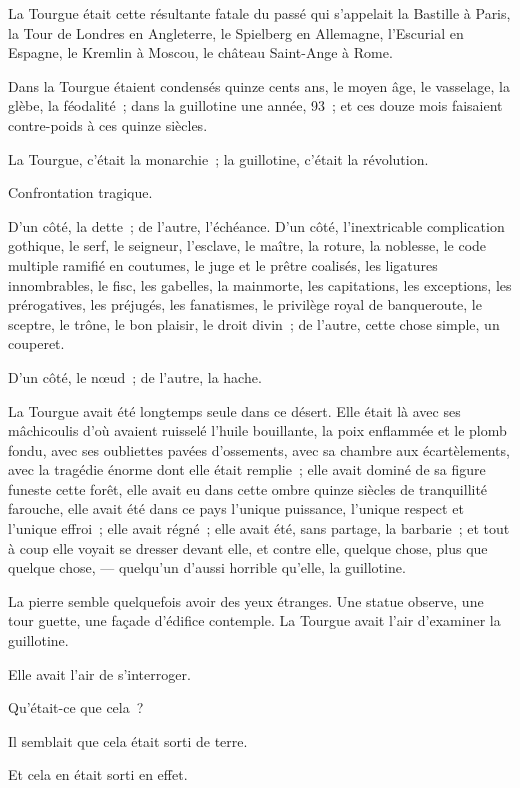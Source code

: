 \documentclass[french,twoside]{book} %
\begin{document}
La Tourgue était cette résultante fatale du passé qui s’appelait la Bastille à Paris, la Tour de Londres en Angleterre, le Spielberg en Allemagne, l’Escurial  en Espagne, le Kremlin à Moscou, le château Saint-Ange à Rome.\par
Dans la Tourgue étaient condensés quinze cents ans, le moyen âge, le vasselage, la glèbe, la féodalité ; dans la guillotine une année, 93 ; et ces douze mois faisaient contre-poids à ces quinze siècles.\par
La Tourgue, c’était la monarchie ; la guillotine, c’était la révolution.\par
Confrontation tragique.\par
D’un côté, la dette ; de l’autre, l’échéance. D’un côté, l’inextricable complication gothique, le serf, le seigneur, l’esclave, le maître, la roture, la noblesse, le code multiple ramifié en coutumes, le juge et le prêtre coalisés, les ligatures innombrables, le fisc, les gabelles, la mainmorte, les capitations, les exceptions, les prérogatives, les préjugés, les fanatismes, le privilège royal de banqueroute, le sceptre, le trône, le bon plaisir, le droit divin ; de l’autre, cette chose simple, un couperet.\par
D’un côté, le nœud ; de l’autre, la hache.\par
La Tourgue avait été longtemps seule dans ce désert. Elle était là avec ses mâchicoulis d’où avaient ruisselé l’huile bouillante, la poix enflammée et le plomb fondu, avec ses oubliettes pavées d’ossements, avec sa chambre aux écartèlements, avec la tragédie énorme dont elle était remplie ; elle avait dominé de sa figure funeste cette forêt, elle avait eu dans cette ombre quinze siècles de tranquillité farouche, elle avait été dans ce pays l’unique puissance, l’unique respect et l’unique effroi ; elle avait régné ;  elle avait été, sans partage, la barbarie ; et tout à coup elle voyait se dresser devant elle, et contre elle, quelque chose, plus que quelque chose, — quelqu’un d’aussi horrible qu’elle, la guillotine.\par
La pierre semble quelquefois avoir des yeux étranges. Une statue observe, une tour guette, une façade d’édifice contemple. La Tourgue avait l’air d’examiner la guillotine.\par
Elle avait l’air de s’interroger.\par
Qu’était-ce que cela ?\par
Il semblait que cela était sorti de terre.\par
Et cela en était sorti en effet.\par
\end{document}
